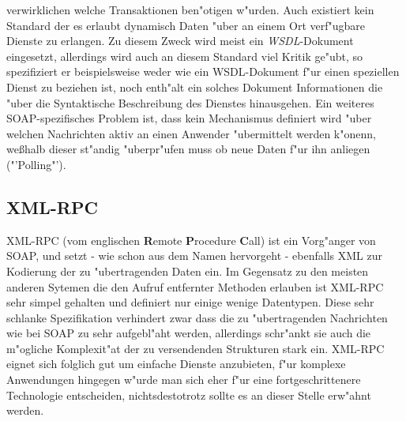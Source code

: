 verwirklichen welche Transaktionen ben"otigen w"urden. Auch existiert kein Standard der es erlaubt dynamisch Daten "uber an einem Ort verf"ugbare
Dienste zu erlangen. Zu diesem Zweck wird meist ein \emph{WSDL}-Dokument \cite{WSDLSPEC} eingesetzt, allerdings wird auch an diesem
Standard viel Kritik ge"ubt, so spezifiziert er beispielsweise weder wie ein WSDL-Dokument f"ur einen speziellen Dienst zu beziehen ist,
noch enth"alt ein solches Dokument Informationen die "uber die Syntaktische Beschreibung des Dienstes hinausgehen.
Ein weiteres SOAP-spezifisches Problem ist,
dass kein Mechanismus definiert wird "uber welchen Nachrichten aktiv an einen Anwender "ubermittelt werden k"onenn, we\ss halb dieser
st"andig "uberpr"ufen muss ob neue Daten f"ur ihn anliegen ("'Polling"').

\subsection{XML-RPC}
\label{sec:intro:stand:xmlrpc}
XML-RPC (vom englischen \textbf{R}emote \textbf{P}rocedure \textbf{C}all) ist ein Vorg"anger von SOAP, und setzt - wie schon
aus dem Namen hervorgeht - ebenfalls XML zur Kodierung der zu "ubertragenden Daten ein. Im Gegensatz zu den meisten anderen
Sytemen die den Aufruf entfernter Methoden erlauben ist XML-RPC sehr simpel gehalten und definiert nur einige wenige
Datentypen. Diese sehr schlanke Spezifikation verhindert zwar dass die zu "ubertragenden Nachrichten wie bei SOAP zu sehr 
aufgebl"aht werden, allerdings schr"ankt sie auch die m"ogliche Komplexit"at der zu versendenden Strukturen stark ein.
XML-RPC eignet sich folglich gut um einfache Dienste anzubieten, f"ur komplexe Anwendungen hingegen w"urde man sich eher 
f"ur eine fortgeschrittenere Technologie entscheiden, nichtsdestotrotz sollte es an dieser Stelle erw"ahnt werden.

